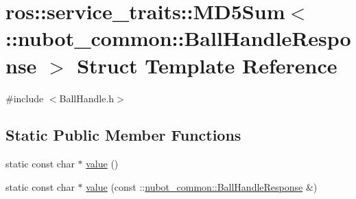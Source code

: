\hypertarget{structros_1_1service__traits_1_1MD5Sum_3_01_1_1nubot__common_1_1BallHandleResponse_01_4}{\section{ros\-:\-:service\-\_\-traits\-:\-:M\-D5\-Sum$<$ \-:\-:nubot\-\_\-common\-:\-:Ball\-Handle\-Response $>$ Struct Template Reference}
\label{structros_1_1service__traits_1_1MD5Sum_3_01_1_1nubot__common_1_1BallHandleResponse_01_4}
}


{\ttfamily \#include $<$Ball\-Handle.\-h$>$}

\subsection*{Static Public Member Functions}
\begin{DoxyCompactItemize}
\item 
static const char $\ast$ \hyperlink{structros_1_1service__traits_1_1MD5Sum_3_01_1_1nubot__common_1_1BallHandleResponse_01_4_ae94fc0abc5c2a82bb6e04895cb2d3f93}{value} ()
\item 
static const char $\ast$ \hyperlink{structros_1_1service__traits_1_1MD5Sum_3_01_1_1nubot__common_1_1BallHandleResponse_01_4_ac30ea6839dca1b85c9ba2446f8e1200f}{value} (const \-::\hyperlink{namespacenubot__common_a794ba6eb699c7139e7256886a99845bb}{nubot\-\_\-common\-::\-Ball\-Handle\-Response} \&)
\end{DoxyCompactItemize}


